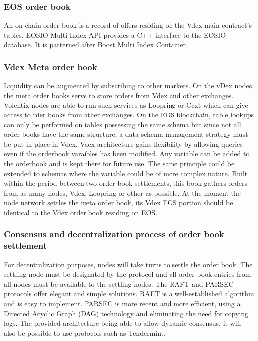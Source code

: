 \documentclass[]{article}
\begin{document}
{\subsubsection{EOS order book}
An on-chain order book is a record of offers residing on the Vdex main contract's tables. 
EOSIO Multi-Index API provides a C++ interface to the EOSIO database. It is patterned after Boost Multi Index Container. 

\subsubsection{Vdex Meta order book}
Liquidity can be augmented by subscribing to other markets.
On the vDex nodes, the meta order books serve to store orders from Vdex and other exchanges. Volentix nodes are able to run such services as Loopring or Ccxt which can give access to rder books from other exchanges.
On the EOS blockchain, table lookups can only be performed on tables possessing the same schema but since not all order books have the same structure, a data schema management strategy must be put in place in Vdex. 
Vdex architecture gains flexibility by allowing queries even if the orderbook varaibles has been modified. Any variable can be added to the orderbook and is kept there for future use. 
The same principle could be extended to schemas where the variable could be of more complex nature.
Built within the period between two order book settlements, this book gathers orders from as many nodes, Vdex, Loopring or other as possible. At the moment the node network settles the meta order book, its Vdex EOS portion should be identical to the Vdex order book residing on EOS.

\subsubsection{Consensus and decentralization process of order book settlement}
For decentralization purposes, nodes will take turns to settle the order book. 
The settling node must be designated by the protocol and all order book entries from all nodes must be available to the settling nodes. 
The RAFT\cite{18} and PARSEC\cite{23} protocols offer elegant and simple solutions. 
RAFT is a well-established algorithm and is easy to implement. PARSEC is more recent and more efficient, using a Directed Acyclic Graph (DAG) technology and eliminating the need for copying logs.
The provided architecture being able to allow dynamic consensus, it will also be possible to use protocols such as Tendermint.

}
\end{document}
